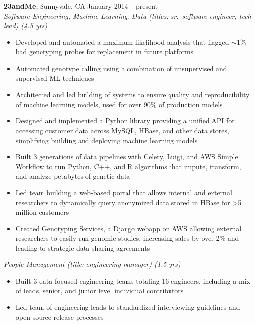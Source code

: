\documentclass[margin,line]{resume}
\begin{document}
\begin{resume}
    \textbf{23andMe}, Sunnyvale, CA \hfill\vspace{1mm}\hfill January 2014 -- present\\%
    \textsl{Software Engineering, Machine Learning, Data (titles: sr.\ software engineer, tech lead) (4.5 yrs)}
    \begin{itemize}
    \item Developed and automated a maximum likelihood analysis that flagged \(\sim1\%\) bad genotyping probes for replacement in future platforms
    \item Automated genotype calling using a combination of unsupervised and supervised ML techniques
    \item Architected and led building of systems to ensure quality and reproducibility of machine learning models, used for over 90\% of production models
    \item Designed and implemented a Python library providing a unified API for accessing customer data across MySQL, HBase, and other data stores, simplifying building and deploying machine learning models
    \item Built 3 generations of data pipelines with Celery, Luigi, and AWS Simple Workflow to run Python, C++, and R algorithms that impute, transform, and analyze petabytes of genetic data
    \item Led team building a web-based portal that allows internal and external researchers to dynamically query anonymized data stored in HBase for \textgreater 5 million customers
    \item Created Genotyping Services, a Django webapp on AWS allowing external researchers to easily run genomic studies, increasing sales by over 2\% and leading to strategic data-sharing agreements
    \end{itemize}
    \textsl{People Management (title: engineering manager) (1.5 yrs)}
    \begin{itemize}
    \item Built 3 data-focused engineering teams totaling 16 engineers, including a mix of leads, senior, and junior level individual contributors
    \item Led team of engineering leads to standardized interviewing guidelines and open source release processes
    \end{itemize}


\end{resume}
\end{document}
